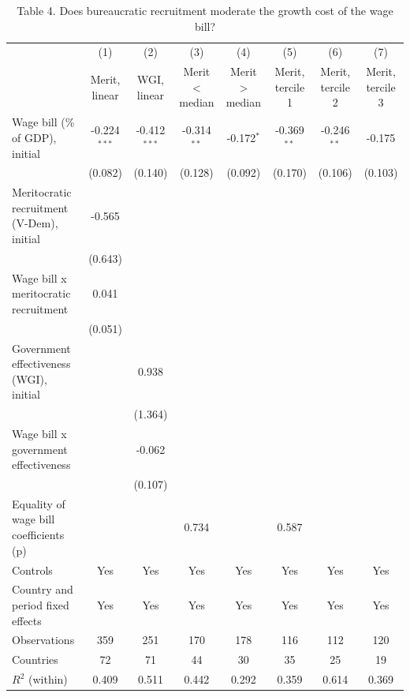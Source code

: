 \begin{table}[htbp]\centering\footnotesize
\providecommand{\sym}[1]{\ensuremath{^{#1}}}
\caption{Table 4. Does bureaucratic recruitment moderate the growth cost of the wage bill?}\label{tab:Table4_moderation}
\begin{tabular}{l*{7}{c}}
\toprule
 & (1) & (2) & (3) & (4) & (5) & (6) & (7) \\
 & Merit, linear & WGI, linear & Merit < median & Merit > median & Merit, tercile 1 & Merit, tercile 2 & Merit, tercile 3 \\
\midrule
Wage bill (\% of GDP), initial & -0.224\sym{***} & -0.412\sym{***} & -0.314\sym{**} & -0.172\sym{*} & -0.369\sym{**} & -0.246\sym{**} & -0.175 \\
 & (0.082) & (0.140) & (0.128) & (0.092) & (0.170) & (0.106) & (0.103) \\
Meritocratic recruitment (V-Dem), initial & -0.565 &  &  &  &  &  &  \\
 & (0.643) &  &  &  &  &  &  \\
Wage bill x meritocratic recruitment & 0.041 &  &  &  &  &  &  \\
 & (0.051) &  &  &  &  &  &  \\
Government effectiveness (WGI), initial &  & 0.938 &  &  &  &  &  \\
 &  & (1.364) &  &  &  &  &  \\
Wage bill x government effectiveness &  & -0.062 &  &  &  &  &  \\
 &  & (0.107) &  &  &  &  &  \\
\midrule
Equality of wage bill coefficients (p) &  &  & 0.734 &  & 0.587 &  &  \\
Controls & Yes & Yes & Yes & Yes & Yes & Yes & Yes \\
Country and period fixed effects & Yes & Yes & Yes & Yes & Yes & Yes & Yes \\
Observations & 359 & 251 & 170 & 178 & 116 & 112 & 120 \\
Countries & 72 & 71 & 44 & 30 & 35 & 25 & 19 \\
$R^2$ (within) & 0.409 & 0.511 & 0.442 & 0.292 & 0.359 & 0.614 & 0.369 \\
\bottomrule
\end{tabular}

\end{table}
